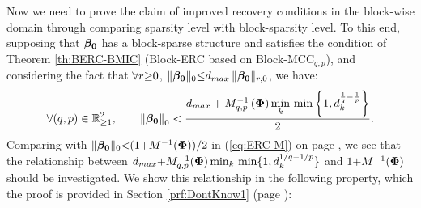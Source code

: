 Now we need to prove the claim of improved recovery conditions in the block-wise domain through comparing sparsity level with block-sparsity level. 
To this end, supposing that $\boldsymbol{\beta_0}$ has a block-sparse structure and satisfies the condition of Theorem \ref{th:BERC-BMIC} (Block-ERC based on Block-MCC$_{q,p}$), and considering the fact that $\forall r {\geq} 0$, $\Vert \boldsymbol{\beta_0} \Vert_{0} {\leq} d_{max} \, \Vert \boldsymbol{\beta_0} \Vert_{r,0}$, we have:
\begin{equation*}
\forall (q,p) \in \mathbb{R}^2_{\geq 1}, \qquad
\left\lVert\boldsymbol{\beta_0}\right\rVert_{0} < 
\frac{d_{max} + M_{q,p}^{-1}\left( \boldsymbol{\Phi} \right) \displaystyle\min_{k} \, \min \left\lbrace 1 , d_k^{\frac1q - \frac1p} \right\rbrace}{2}.
\end{equation*}
Comparing with $\Vert \boldsymbol{\beta_0} \Vert_0 {<} (1 {+} M^{-1} (\boldsymbol{\Phi}))/2$ in (\ref{eq:ERC-M}) on page \pageref{eq:ERC-M}, we see that the relationship between $d_{max} {+} M_{q,p}^{-1}(\boldsymbol{\Phi}) \min_{k} \, \min \{1 , d_k^{1/q {-} 1/p} \}$ and $1 {+} M^{-1}(\boldsymbol{\Phi})$ should be investigated. 
We show this relationship in the following property, which the proof is provided in Section \ref{prf:DontKnow1} (page \pageref{prf:DontKnow1}):
